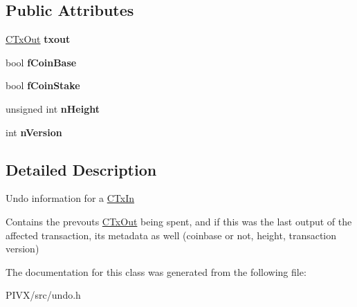 \subsection*{Public Attributes}
\begin{DoxyCompactItemize}
\item 
\mbox{\label{class_c_tx_in_undo_a0eb1374984b5b68b0af14d88d7d4b821}} 
\mbox{\hyperlink{class_c_tx_out}{C\+Tx\+Out}} {\bfseries txout}
\item 
\mbox{\label{class_c_tx_in_undo_a5952f917224de3a2193157b856c47864}} 
bool {\bfseries f\+Coin\+Base}
\item 
\mbox{\label{class_c_tx_in_undo_a59d196d060b8241e8e95640144de6155}} 
bool {\bfseries f\+Coin\+Stake}
\item 
\mbox{\label{class_c_tx_in_undo_af022118f015a9b1b9ab96e04e8452292}} 
unsigned int {\bfseries n\+Height}
\item 
\mbox{\label{class_c_tx_in_undo_a193281289475ca792e436a7a02de23ef}} 
int {\bfseries n\+Version}
\end{DoxyCompactItemize}


\subsection{Detailed Description}
Undo information for a \mbox{\hyperlink{class_c_tx_in}{C\+Tx\+In}}

Contains the prevout\textquotesingle{}s \mbox{\hyperlink{class_c_tx_out}{C\+Tx\+Out}} being spent, and if this was the last output of the affected transaction, its metadata as well (coinbase or not, height, transaction version) 

The documentation for this class was generated from the following file\+:\begin{DoxyCompactItemize}
\item 
P\+I\+V\+X/src/undo.\+h\end{DoxyCompactItemize}
